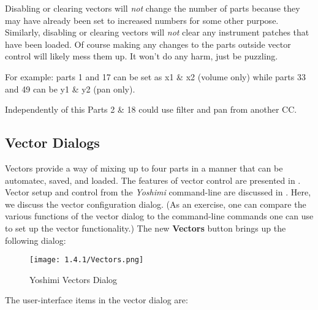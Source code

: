    Disabling or clearing vectors will \textsl{not} change the number of parts
   because they may have already been set to increased numbers for some other
   purpose.  Similarly, disabling or clearing vectors will \textsl{not} clear
   any instrument patches that have been loaded.
   Of course making any changes to the parts outside vector control will likely
   mess them up. It won't do any harm, just be puzzling.

   For example:
   parts 1 and 17 can be set as x1 \& x2 (volume only) while parts 33 and 49
   can be y1 \& y2 (pan only).

   Independently of this Parts 2 \& 18 could use filter and pan from another
   CC.

\subsection{Vector Dialogs}
\label{subsec:vector_dialogs}

   Vectors provide a way of mixing up to four parts in a manner that can be
   automatec, saved, and loaded.  The features of vector control are presented
   in .
   Vector setup and control from the \textsl{Yoshimi} command-line are
   discussed in
   .
   Here, we discuss the vector configuration dialog.
   (As an exercise, one can compare the various functions of the vector dialog
   to the command-line commands one can use to set up the vector
   functionality.)
   The new \textbf{Vectors} button brings up the following dialog:

\begin{figure}[H]
   \centering 
   \texttt{[image: 1.4.1/Vectors.png]}
   \caption{Yoshimi Vectors Dialog}
   \label{fig:yoshimi_vectors_dialog}
\end{figure}

   The user-interface items in the vector dialog are:

